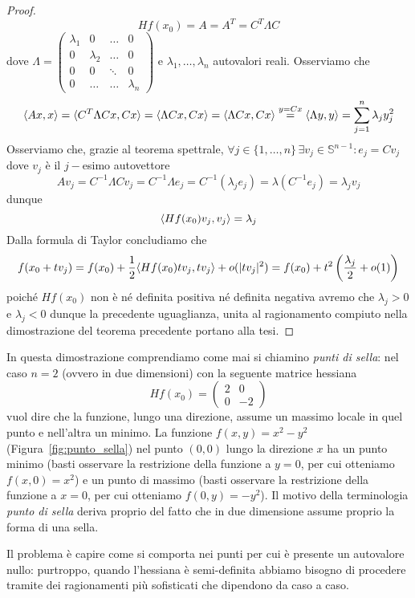 \begin{proof}
$$
Hf(x_0)=A=A^T=C^T \Lambda C
$$
dove $\Lambda = \begin{pmatrix} \lambda_1 & 0 & \ldots & 0 \\
0 & \lambda_2 & \ldots & 0 \\
0 & 0 & \ddots & 0 \\ 0 & \ldots & \ldots & \lambda_n \end{pmatrix}$ e $\lambda_1, \ldots, \lambda_n$ autovalori reali. Osserviamo che
$$
\langle Ax, x \rangle = \langle C^T \Lambda Cx, Cx \rangle = \langle \Lambda Cx, Cx \rangle =  \langle \Lambda Cx, Cx \rangle \stackrel{y=Cx}{=} \langle \Lambda y, y \rangle = \sum_{j=1}^n \lambda_j y_j^2
$$
Osserviamo che, grazie al teorema spettrale, $\forall j \in \{1, \ldots, n \} \, \exists v_j \in \mathbb{S}^{n-1} : e_j = Cv_j$ dove $v_j$ è il $j-$esimo autovettore
$$
Av_j = C^{-1} \Lambda Cv_j = C^{-1} \Lambda e_j = C^{-1} (\lambda_j e_j) = \lambda (C^{-1} e_j) = \lambda_j v_j
$$
dunque
$$
\langle Hf(x_0)v_j, v_j \rangle = \lambda_j
$$
Dalla formula di Taylor concludiamo che
$$
f(x_0 + tv_j) = f(x_0) + \frac{1}{2} \langle Hf(x_0)tv_j, tv_j \rangle + o(|tv_j|^2) = f(x_0) + t^2 \left( \frac{\lambda_j}{2} + o(1) \right)
$$
poiché $Hf(x_0)$ non è né definita positiva né definita negativa avremo che $\lambda_j > 0$ e $\lambda_j < 0$ dunque la precedente uguaglianza, unita al ragionamento compiuto nella dimostrazione del teorema precedente portano alla tesi.
\end{proof}
\begin{remark}
In questa dimostrazione comprendiamo come mai si chiamino \emph{punti di sella}: nel caso $n=2$ (ovvero in due dimensioni) con la seguente matrice hessiana
$$
Hf(x_0) = \begin{pmatrix}
2 & 0 \\
0 & -2
\end{pmatrix}
$$
vuol dire che la funzione, lungo una direzione, assume un massimo locale in quel punto e nell'altra un minimo. La funzione $f(x,y)=x^2-y^2$ (Figura~\ref{fig:punto_sella}) nel punto $(0,0)$ lungo la direzione $x$ ha un punto minimo (basti osservare la restrizione della funzione a $y=0$, per cui otteniamo $f(x, 0)=x^2$) e un punto di massimo (basti osservare la restrizione della funzione a $x=0$, per cui otteniamo $f(0, y) = -y^2$). Il motivo della terminologia \emph{punto di sella} deriva proprio del fatto che in due dimensione assume proprio la forma di una sella.
\end{remark}
Il problema è capire come si comporta nei punti per cui è presente un autovalore nullo: purtroppo, quando l'hessiana è semi-definita abbiamo bisogno di procedere tramite dei ragionamenti più sofisticati che dipendono da caso a caso.